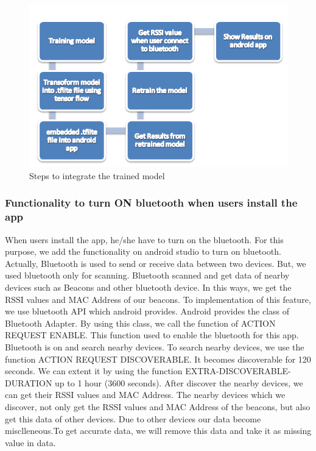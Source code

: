 \begin{figure}[h]
  		\centering
    		\includegraphics[scale=0.8]{./Figures/d1}
\caption{Steps to integrate the trained model}
\label{fig:17}
 		\end{figure}


\subsubsection{Functionality to turn ON bluetooth when users install the app}
When users install the app, he/she have to turn on the bluetooth. For this purpose, we add the functionality on android studio to turn on bluetooth.
Actually, Bluetooth is used to send or receive data between two devices. But, we used bluetooth only for scanning. Bluetooth scanned and get data of nearby devices such as Beacons and other bluetooth device. In this ways, we get the RSSI values and MAC Address of our beacons.
To implementation of this feature, we use bluetooth API which android provides. Android provides the class of Bluetooth Adapter. By using this class, we call the function of ACTION REQUEST ENABLE. This function used to enable the bluetooth for this app. Bluetooth is on and search nearby devices. To search nearby devices, we use the function ACTION REQUEST DISCOVERABLE.   It becomes discoverable for 120 seconds. We can extent it by using the function EXTRA-DISCOVERABLE-DURATION up to 1 hour (3600 seconds). 
After discover the nearby devices, we can get their RSSI values and MAC Address. The nearby devices which we discover, not only get the RSSI values and MAC Address of the beacons, but also get this data of other devices. Due to other devices our data become misclleneous.To get accurate data, we will remove this data and take it as missing value in data. 

